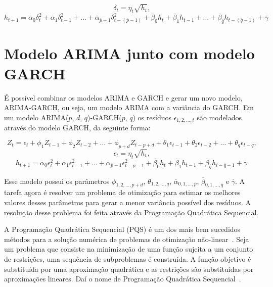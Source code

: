 \[
\delta_t = \eta_t\sqrt{h_t} \text{,}
\]
\vspace{1cm}
\begin{equation}
h_{t+1} = \overline{\alpha}_0\delta_t^2 + \overline{\alpha}_1\delta_{t-1}^2 +
\hdots + \overline{\alpha}_{\overline{p}-1}\delta_{t-(\overline{p}-1)}^2 +
\overline{\beta}_0h_t + \overline{\beta}_1h_{t-1} + \hdots +
\overline{\beta}_{\overline{q}}h_{t-(\overline{q}-1)} + \overline{\gamma}
\label{eq:garch}
\end{equation}

\section{Modelo ARIMA junto com modelo GARCH}

É possível combinar os modelos ARIMA e GARCH e gerar um novo modelo,
ARIMA-GARCH, ou seja, um modelo ARIMA com a variância do GARCH. Em um modelo
ARIMA($p$, $d$, $q$)-GARCH($\overline{p}$, $\overline{q}$) os resíduos
$\epsilon_{1,2,\hdots,t}$ são modelados através do modelo GARCH, da seguinte
forma:

\[
Z_t = \epsilon_t + \phi_1Z_{t-1} + \phi_2Z_{t-2} + \hdots + \phi_{p+d}Z_{t-p+d}
+ \theta_1\epsilon_{t-1} + \theta_2\epsilon_{t-2} + \hdots +
\theta_q\epsilon_{t-q}\text{,}
\]
\[
\epsilon_t = \eta_t\sqrt{h_t}\text{,}
\]
\vspace{1cm}
\begin{equation}
h_{t+1} = \overline{\alpha}_0\epsilon_t^2 + \overline{\alpha}_1\epsilon_{t-1}^2
+ \hdots + \overline{\alpha}_{\overline{p}-1}\epsilon_{t-\overline{p}-1}^2 +
\overline{\beta}_0h_t + \overline{\beta}_1h_{t-1} +
\overline{\beta}_{\overline{q}}h_{i - \overline{q} - 1} + \overline{\gamma}
\label{eq:arimagarch}
\end{equation}

Esse modelo possui os parâmetros $\phi_{1, 2, \hdots, p+d}$, $\theta_{1, 2,
\hdots, q}$, $\overline{\alpha}_{0, 1, \hdots, \overline{p}}$,
$\overline{\beta}_{0, 1, \hdots, \overline{q}}$ e $\overline{\gamma}$. A tarefa
agora é resolver um problema de otimização para estimar os melhores valores
desses parâmetros para gerar a menor variância possível dos resíduos. A
resolução desse problema foi feita através da Programação Quadrática
Sequencial.

A Programação Quadrática Sequencial (PQS) é um dos mais bem sucedidos métodos
para a solução numérica de problemas de otimização
não-linear~\citep{NaoPublicado:OptimizationI}. Seja um problema que consiste na
minimização de uma função sujeita a um conjunto de restrições, uma sequência de
subproblemas é construída. A função objetivo é substituída por uma aproximação
quadrática e as restrições são substituídas por aproximações lineares. Daí o
nome de Programação Quadrática Sequencial~\citep{RelatorioTecnico:ProgQuad}.

